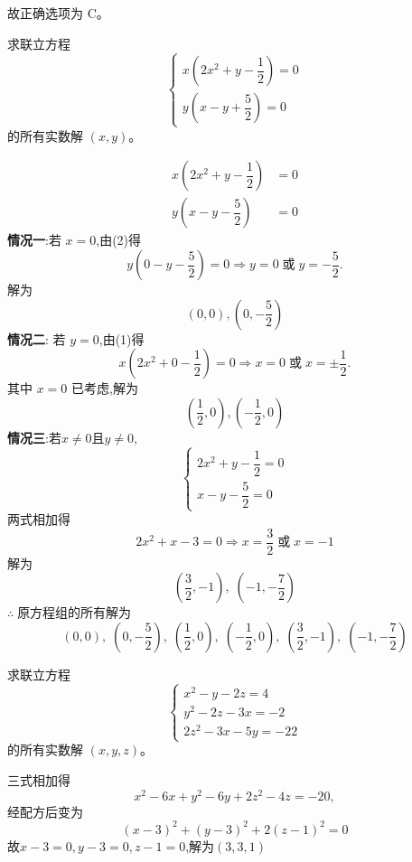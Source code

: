 \begin{questions}
\begin{solution}
故正确选项为 C。
\end{solution}
    \question 求联立方程
    \[
    \begin{cases}
    x\left(2x^2 + y - \dfrac{1}{2}\right) = 0 \\[3pt]
    y \left(x - y + \dfrac{5}{2}\right) = 0
    \end{cases}
    \]
    的所有实数解 $(x, y)$。
    \begin{solution}
        \begin{align}
        x\left(2x^2 + y - \dfrac{1}{2}\right) &= 0 \\[3pt]
        y\left(x - y - \dfrac{5}{2}\right) &= 0
        \end{align}
        \textbf{情况一}:若 $x = 0$,由(2)得
        \[
        y\left(0 - y - \dfrac{5}{2}\right) = 0
        \Rightarrow y = 0 \; \text{或} \; y = -\dfrac{5}{2}.
        \]
        解为$$(0, 0),\left(0, -\dfrac{5}{2}\right)$$
        \textbf{情况二}: 若 $y = 0$,由(1)得
        \[
        x\left(2x^2 + 0 - \dfrac{1}{2}\right) = 0
        \Rightarrow x = 0 \; \text{或} \; x = \pm \dfrac{1}{2}.
        \]
        其中 $x=0$ 已考虑,解为
        \[
        \left( \dfrac{1}{2}, 0 \right), \left( -\dfrac{1}{2}, 0 \right)
        \]
        \textbf{情况三}:若$x\neq0$且$y\neq0$,
        \[
        \begin{cases}
        2x^2 + y - \dfrac{1}{2} = 0 \\[3pt]
        x - y - \dfrac{5}{2} = 0
        \end{cases}
        \]
        两式相加得
        \[
        2x^2 + x - 3 = 0
        \Rightarrow x = \dfrac{3}{2} \; \text{或} \; x = -1
        \]
        解为
        \[
        \left(\dfrac{3}{2}, -1\right),\; \left(-1, -\dfrac{7}{2}\right)
        \]
        $\therefore\;$原方程组的所有解为
        \[
        (0, 0),\;
        \left(0, -\dfrac{5}{2}\right),\;
        \left(\dfrac{1}{2}, 0\right),\;
        \left(-\dfrac{1}{2}, 0\right),\;
        \left(\dfrac{3}{2}, -1\right),\;
        \left(-1, -\dfrac{7}{2}\right)
        \]
    \end{solution}

    \question 求联立方程
    \[
    \begin{cases}
    x^2 - y - 2z = 4 \\
    y^2 - 2z - 3x = -2 \\
    2z^2 - 3x - 5y = -22
    \end{cases}
    \]
    的所有实数解 $(x, y, z)$。 
    \begin{solution}
        三式相加得
        \[
        x^2 - 6x +y^2 - 6y+2z^2-4z = -20,
        \]
        经配方后变为
        \[
        (x-3)^2+(y-3)^2+2(z-1)^2=0
        \]
        故$x-3=0,y-3=0,z-1=0$,解为$(3, 3, 1)$
    \end{solution}
    

\end{questions}
